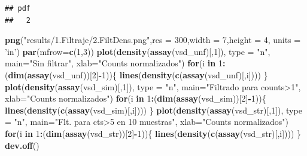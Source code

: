 \documentclass[
]{article}
\newenvironment{Shaded}{\begin{snugshade}}{\end{snugshade}}
\newcommand{\ControlFlowTok}[1]{\textcolor[rgb]{0.13,0.29,0.53}{\textbf{#1}}}
\newcommand{\DataTypeTok}[1]{\textcolor[rgb]{0.13,0.29,0.53}{#1}}
\newcommand{\DecValTok}[1]{\textcolor[rgb]{0.00,0.00,0.81}{#1}}
\newcommand{\KeywordTok}[1]{\textcolor[rgb]{0.13,0.29,0.53}{\textbf{#1}}}
\newcommand{\NormalTok}[1]{#1}
\newcommand{\OperatorTok}[1]{\textcolor[rgb]{0.81,0.36,0.00}{\textbf{#1}}}
\newcommand{\StringTok}[1]{\textcolor[rgb]{0.31,0.60,0.02}{#1}}
\begin{document}
\begin{verbatim}
## pdf 
##   2
\end{verbatim}

\begin{Shaded}
\begin{Highlighting}[]
\KeywordTok{png}\NormalTok{(}\StringTok{"results/1.Filtraje/2.FiltDens.png"}\NormalTok{,}\DataTypeTok{res =} \DecValTok{300}\NormalTok{,}\DataTypeTok{width =} \DecValTok{7}\NormalTok{,}\DataTypeTok{height =} \DecValTok{4}\NormalTok{, }\DataTypeTok{units =} \StringTok{'in'}\NormalTok{)}
\KeywordTok{par}\NormalTok{(}\DataTypeTok{mfrow=}\KeywordTok{c}\NormalTok{(}\DecValTok{1}\NormalTok{,}\DecValTok{3}\NormalTok{))}
\KeywordTok{plot}\NormalTok{(}\KeywordTok{density}\NormalTok{(}\KeywordTok{assay}\NormalTok{(vsd_unf)[,}\DecValTok{1}\NormalTok{]), }\DataTypeTok{type =} \StringTok{"n"}\NormalTok{, }\DataTypeTok{main=}\StringTok{"Sin filtrar"}\NormalTok{,}
     \DataTypeTok{xlab=}\StringTok{"Counts normalizados"}\NormalTok{)}
\ControlFlowTok{for}\NormalTok{(i }\ControlFlowTok{in} \DecValTok{1}\OperatorTok{:}\NormalTok{(}\KeywordTok{dim}\NormalTok{(}\KeywordTok{assay}\NormalTok{(vsd_unf))[}\DecValTok{2}\NormalTok{]}\OperatorTok{-}\DecValTok{1}\NormalTok{))\{}
  \KeywordTok{lines}\NormalTok{(}\KeywordTok{density}\NormalTok{(}\KeywordTok{c}\NormalTok{(}\KeywordTok{assay}\NormalTok{(vsd_unf)[,i])))}
\NormalTok{\}}
\KeywordTok{plot}\NormalTok{(}\KeywordTok{density}\NormalTok{(}\KeywordTok{assay}\NormalTok{(vsd_sim)[,}\DecValTok{1}\NormalTok{]), }\DataTypeTok{type =} \StringTok{"n"}\NormalTok{, }\DataTypeTok{main=}\StringTok{"Filtrado para counts>1"}\NormalTok{,}
     \DataTypeTok{xlab=}\StringTok{"Counts normalizados"}\NormalTok{)}
\ControlFlowTok{for}\NormalTok{(i }\ControlFlowTok{in} \DecValTok{1}\OperatorTok{:}\NormalTok{(}\KeywordTok{dim}\NormalTok{(}\KeywordTok{assay}\NormalTok{(vsd_sim))[}\DecValTok{2}\NormalTok{]}\OperatorTok{-}\DecValTok{1}\NormalTok{))\{}
  \KeywordTok{lines}\NormalTok{(}\KeywordTok{density}\NormalTok{(}\KeywordTok{c}\NormalTok{(}\KeywordTok{assay}\NormalTok{(vsd_sim)[,i])))}
\NormalTok{\}}
\KeywordTok{plot}\NormalTok{(}\KeywordTok{density}\NormalTok{(}\KeywordTok{assay}\NormalTok{(vsd_str)[,}\DecValTok{1}\NormalTok{]), }\DataTypeTok{type =} \StringTok{"n"}\NormalTok{, }\DataTypeTok{main=}\StringTok{"Flt. para cts>5 en 10 muestras"}\NormalTok{,}
     \DataTypeTok{xlab=}\StringTok{"Counts normalizados"}\NormalTok{)}
\ControlFlowTok{for}\NormalTok{(i }\ControlFlowTok{in} \DecValTok{1}\OperatorTok{:}\NormalTok{(}\KeywordTok{dim}\NormalTok{(}\KeywordTok{assay}\NormalTok{(vsd_str))[}\DecValTok{2}\NormalTok{]}\OperatorTok{-}\DecValTok{1}\NormalTok{))\{}
  \KeywordTok{lines}\NormalTok{(}\KeywordTok{density}\NormalTok{(}\KeywordTok{c}\NormalTok{(}\KeywordTok{assay}\NormalTok{(vsd_str)[,i])))}
\NormalTok{\}}
\KeywordTok{dev.off}\NormalTok{()}
\end{Highlighting}
\end{Shaded}
\end{document}
